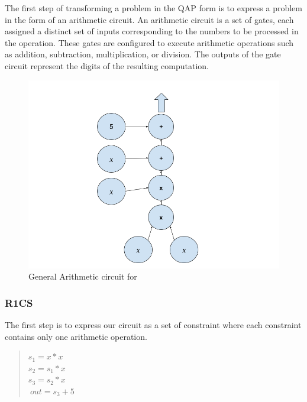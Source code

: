 The first step of transforming a problem in the QAP form is to express a problem in the form of an arithmetic circuit.
An arithmetic circuit is a set of gates, each assigned a distinct set of inputs corresponding to the numbers to be processed in the operation.
These gates are configured to execute arithmetic operations such as addition, subtraction, multiplication, or division. The outputs of the gate circuit represent the digits of the resulting computation.

\begin{figure}[H]
\centering
\includegraphics[width=130mm]{ArithmeticCircuit.png}
\caption{General Arithmetic circuit for }
\label{overflow}
\end{figure}

\subsubsection{R1CS}
\label{subsec:r1cs}
The first step is to express our circuit as a set of constraint where each constraint contains only one arithmetic operation.
\begin{quote}
$s_1 = x * x$
\\
$s_2 = s_1 * x$
\\
$s_3 = s_2 * x$
\\
$~out = s_3 + 5$
\end{quote}

